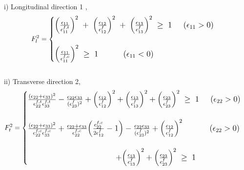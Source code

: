 \documentclass[12pt,a4paper,twoside,openright]{report}
\begin{document}
i) Longitudinal direction 1 ,
\begin{equation}
\large{F_{l}^{2} =  
	\begin{cases}
	
		\Big(\frac{\epsilon_{11}}{\epsilon_{11}^{f,t}}\Big)^{2} \; + \; \Big(\frac{\epsilon_{12}}{\epsilon_{12}^{f}}\Big)^{2} \; + \; \Big(\frac{\epsilon_{13}}{\epsilon_{13}^{f}}\Big)^{2} \; \geq  \; 1  \; \; \; \; \;  (\epsilon_{11}  >  0)  \\
	\\
	\Big(\frac{\epsilon_{11}}{\epsilon_{11}^{f,c}}\Big)^{2}  \; \geq  \; 1 \; \; \; \; \; \; \;  \; \; \; \;  (\epsilon_{11}  <  0) 

	
	\end{cases}}
\end{equation}
\\
ii) Transverse direction 2,
\\
\begin{equation}
\large{F_{t}^{2} =  
	\begin{cases}
	
	\frac{(\epsilon_{22} + \epsilon_{33} )^{2}}{\epsilon_{22}^{f,t} \epsilon_{33}^{f,t}}   -  \frac{\epsilon_{22}\epsilon_{33}}{(\epsilon_{23}^{f})^{2}}  +  \Big(\frac{\epsilon_{12}}{\epsilon_{12}^{f}}\Big)^{2}  + \Big(\frac{\epsilon_{13}}{\epsilon_{13}^{f}}\Big)^{2}  +  \Big(\frac{\epsilon_{23}}{\epsilon_{23}^{f}}\Big)^{2} \;\geq  \; 1 \; \; \; \; \;  (\epsilon_{22}  >  0) \\
	\\
	
	\frac{(\epsilon_{22} + \epsilon_{33} )^{2}}{\epsilon_{22}^{f,c} \epsilon_{33}^{f,c}}  +  \frac{\epsilon_{22} + \epsilon_{33}}{\epsilon_{22}^{f,c}}\Big(\frac{\epsilon_{22}^{f,c}}{2\epsilon_{12}^{f}}  -  1\Big)   -  \frac{\epsilon_{22}\epsilon_{33}}{(\epsilon_{23}^{f})^{2}}  +  \Big(\frac{\epsilon_{12}}{\epsilon_{12}^{f}}\Big)^{2}\; \; \; \; \; \; \; \; \; \; \; \;  (\epsilon_{22}  >  0) \\ 
\\	
	\; \; \; \; \; \; \; \;\; \; \; \; \; \; \; \;\; \; \; \; \; \; \; \;  \; \;\; \; \; \; \; \; \; \;\; \; \; \; \;  + \Big(\frac{\epsilon_{13}}{\epsilon_{13}^{f}}\Big)^{2}   +  \Big(\frac{\epsilon_{23}}{\epsilon_{23}^{f}}\Big)^{2} \;\geq \; 1 
	
	
	\end{cases}}
\end{equation}
\\
\end{document}
